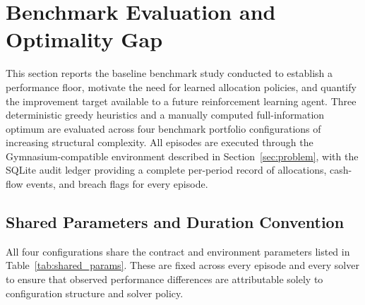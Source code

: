 \section{Benchmark Evaluation and Optimality Gap}
\label{sec:experiments}

This section reports the baseline benchmark study conducted to establish
a performance floor, motivate the need for learned allocation policies,
and quantify the improvement target available to a future reinforcement
learning agent. Three deterministic greedy heuristics and a manually
computed full-information optimum are evaluated across four benchmark
portfolio configurations of increasing structural complexity. All
episodes are executed through the Gymnasium-compatible environment
described in Section~\ref{sec:problem}, with the SQLite audit ledger
providing a complete per-period record of allocations, cash-flow events,
and breach flags for every episode.

\subsection{Shared Parameters and Duration Convention}
\label{subsec:shared_params}

All four configurations share the contract and environment parameters
listed in Table~\ref{tab:shared_params}. These are fixed across every
episode and every solver to ensure that observed performance differences
are attributable solely to configuration structure and solver policy.

